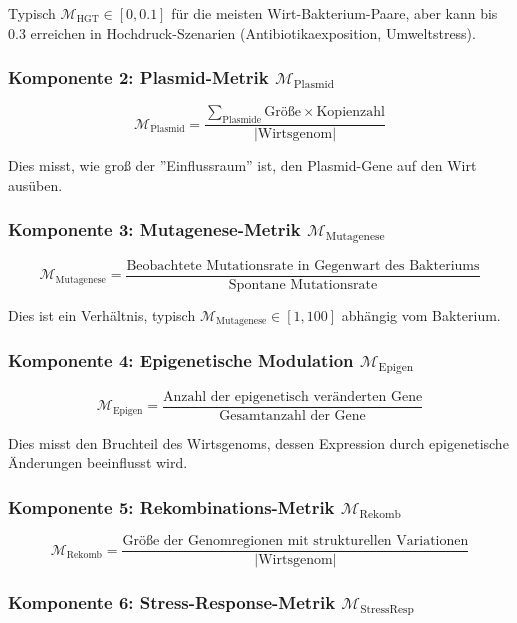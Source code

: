 \documentclass[a4paper,12pt]{article}
\theoremstyle{definition}
\begin{document}
Typisch $\mathcal{M}_{\text{HGT}} \in [0, 0.1]$ für die meisten Wirt-Bakterium-Paare, aber kann bis 0.3 erreichen in Hochdruck-Szenarien (Antibiotikaexposition, Umweltstress).

\subsubsection{Komponente 2: Plasmid-Metrik $\mathcal{M}_{\text{Plasmid}}$}

\[
\mathcal{M}_{\text{Plasmid}} = \frac{\sum_{\text{Plasmide}} \text{Größe} \times \text{Kopienzahl}}{|\text{Wirtsgenom}|}
\]

Dies misst, wie groß der ''Einflussraum'' ist, den Plasmid-Gene auf den Wirt ausüben.

\subsubsection{Komponente 3: Mutagenese-Metrik $\mathcal{M}_{\text{Mutagenese}}$}

\[
\mathcal{M}_{\text{Mutagenese}} = \frac{\text{Beobachtete Mutationsrate in Gegenwart des Bakteriums}}{\text{Spontane Mutationsrate}}
\]

Dies ist ein Verhältnis, typisch $\mathcal{M}_{\text{Mutagenese}} \in [1, 100]$ abhängig vom Bakterium.

\subsubsection{Komponente 4: Epigenetische Modulation $\mathcal{M}_{\text{Epigen}}$}

\[
\mathcal{M}_{\text{Epigen}} = \frac{\text{Anzahl der epigenetisch veränderten Gene}}{\text{Gesamtanzahl der Gene}}
\]

Dies misst den Bruchteil des Wirtsgenoms, dessen Expression durch epigenetische Änderungen beeinflusst wird.

\subsubsection{Komponente 5: Rekombinations-Metrik $\mathcal{M}_{\text{Rekomb}}$}

\[
\mathcal{M}_{\text{Rekomb}} = \frac{\text{Größe der Genomregionen mit strukturellen Variationen}}{|\text{Wirtsgenom}|}
\]

\subsubsection{Komponente 6: Stress-Response-Metrik $\mathcal{M}_{\text{StressResp}}$}
\end{document}
